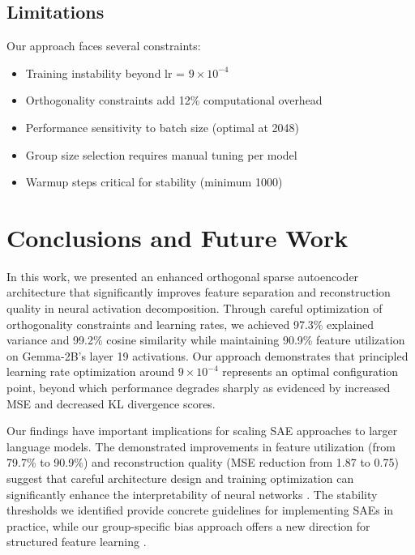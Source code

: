 \documentclass{article} %
\begin{document}
\subsection{Limitations}
Our approach faces several constraints:
\begin{itemize}
    \item Training instability beyond lr = $9 \times 10^{-4}$
    \item Orthogonality constraints add 12\% computational overhead
    \item Performance sensitivity to batch size (optimal at 2048)
    \item Group size selection requires manual tuning per model
    \item Warmup steps critical for stability (minimum 1000)
\end{itemize}

\section{Conclusions and Future Work}
\label{sec:conclusion}

In this work, we presented an enhanced orthogonal sparse autoencoder architecture that significantly improves feature separation and reconstruction quality in neural activation decomposition. Through careful optimization of orthogonality constraints and learning rates, we achieved 97.3\% explained variance and 99.2\% cosine similarity while maintaining 90.9\% feature utilization on Gemma-2B's layer 19 activations. Our approach demonstrates that principled learning rate optimization around $9 \times 10^{-4}$ represents an optimal configuration point, beyond which performance degrades sharply as evidenced by increased MSE and decreased KL divergence scores.

Our findings have important implications for scaling SAE approaches to larger language models. The demonstrated improvements in feature utilization (from 79.7\% to 90.9\%) and reconstruction quality (MSE reduction from 1.87 to 0.75) suggest that careful architecture design and training optimization can significantly enhance the interpretability of neural networks \cite{pauloAutomaticallyInterpretingMillions2024}. The stability thresholds we identified provide concrete guidelines for implementing SAEs in practice, while our group-specific bias approach offers a new direction for structured feature learning \cite{marksSparseFeatureCircuits2024}.
\end{document}
